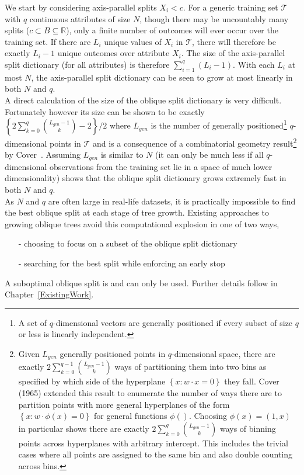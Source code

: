 We start by considering axis-parallel splits $X_i<c$. For a generic training set $\mathcal{T}$ with $q$ continuous attributes of size $N$, though there may be uncountably many splits ($c\subset B\subseteq\mathbb{R}$), only a finite number of outcomes will ever occur over the training set. If there are $L_i$ unique values of $X_i$ in $\mathcal{T}$, there will therefore be exactly $L_i-1$ unique outcomes over attribute $X_i$. The size of the axis-parallel split dictionary (for all attributes) is therefore $\sum_{i=1}^q (L_i-1)$. With each $L_i$ at most $N$, the axis-parallel split dictionary can be seen to grow at most linearly in both $N$ and $q$.\\

A direct calculation of the size of the oblique split dictionary is very difficult. Fortunately however its size can be shown to be exactly $\left\{2\sum_{k=0}^{q} {L_{gen}-1\choose k}-2\right\}/2$ where $L_{gen}$ is the number of generally positioned\footnote{A set of $q$-dimensional vectors are generally positioned if every subset of size $q$ or less is linearly independent.} $q$-dimensional points in $\mathcal{T}$ and is a consequence of a combinatorial geometry result\footnote{Given $L_{gen}$ generally positioned points in $q$-dimensional space, there are exactly $2\sum_{k=0}^{q-1} {L_{gen}-1\choose k}$ ways of partitioning them into two bins as specified by which side of the hyperplane $\left\{x:w\cdot x=0\right\}$ they fall. Cover (1965) extended this result to enumerate the number of ways there are to partition points with more general hyperplanes of the form $\left\{x:w\cdot \phi(x)=0\right\}$ for general functions $\phi()$. Choosing $\phi(x)=(1,x)$ in particular shows there are exactly $2\sum_{k=0}^{q} {L_{gen}-1\choose k}$ ways of binning points across hyperplanes with arbitrary intercept. This includes the trivial cases where all points are assigned to the same bin and also double counting across bins.} by Cover~\cite{Cover65}. Assuming $L_{gen}$ is similar to $N$ (it can only be much less if all $q$-dimensional observations from the training set lie in a space of much lower dimensionality) shows that the oblique split dictionary grows extremely fast in both $N$ and $q$. \\

As $N$ and $q$ are often large in real-life datasets, it is practically impossible to find the best oblique split at each stage of tree growth. Existing approaches to growing oblique trees avoid this computational explosion in one of two ways,
\begin{itemize}
\item[-] choosing to focus on a subset of the oblique split dictionary
\item[-] searching for the best split while enforcing an early stop
\end{itemize}
A suboptimal oblique split is and can only be used. Further details follow in Chapter~\ref{ExistingWork}.

